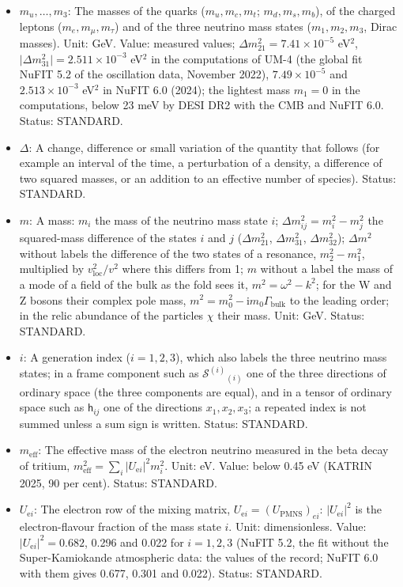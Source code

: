 \documentclass[
  10pt,
]{article}
\providecommand{\tightlist}{%
  \setlength{\itemsep}{0pt}\setlength{\parskip}{0pt}}
\begin{document}
\begin{itemize}
\tightlist
\item
  \(m_u, \dots, m_3\): The masses of the quarks (\(m_u, m_c, m_t\);
  \(m_d, m_s, m_b\)), of the charged leptons (\(m_e, m_\mu, m_\tau\))
  and of the three neutrino mass states (\(m_1, m_2, m_3\), Dirac
  masses). Unit: GeV. Value: measured values;
  \(\Delta m_{21}^2 = 7.41\times10^{-5}\) eV\(^2\),
  \(\lvert\Delta m_{31}^2\rvert = 2.511\times10^{-3}\) eV\(^2\) in the
  computations of UM-4 (the global fit NuFIT 5.2 of the oscillation
  data, November 2022), \(7.49\times10^{-5}\) and \(2.513\times10^{-3}\)
  eV\(^2\) in NuFIT 6.0 (2024); the lightest mass \(m_1 = 0\) in the
  computations, below 23 meV by DESI DR2 with the CMB and NuFIT 6.0.
  Status: STANDARD.
\item
  \(\Delta\): A change, difference or small variation of the quantity
  that follows (for example an interval of the time, a perturbation of a
  density, a difference of two squared masses, or an addition to an
  effective number of species). Status: STANDARD.
\item
  \(m\): A mass: \(m_i\) the mass of the neutrino mass state \(i\);
  \(\Delta m_{ij}^2 = m_i^2 - m_j^2\) the squared-mass difference of the
  states \(i\) and \(j\) (\(\Delta m_{21}^2\), \(\Delta m_{31}^2\),
  \(\Delta m_{32}^2\)); \(\Delta m^2\) without labels the difference of
  the two states of a resonance, \(m_2^2 - m_1^2\), multiplied by
  \(v_{\mathrm{loc}}^2/v^2\) where this differs from 1; \(m\) without a
  label the mass of a mode of a field of the bulk as the fold sees it,
  \(m^2 = \omega^2 - k^2\); for the W and Z bosons their complex pole
  mass, \(m^2 = m_0^2 - \mathrm{i}m_0\Gamma_{\mathrm{bulk}}\) to the
  leading order; in the relic abundance of the particles \(\chi\) their
  mass. Unit: GeV. Status: STANDARD.
\item
  \(i\): A generation index (\(i = 1, 2, 3\)), which also labels the
  three neutrino mass states; in a frame component such as
  \(\mathcal{S}^{(i)}{}_{(i)}\) one of the three directions of ordinary
  space (the three components are equal), and in a tensor of ordinary
  space such as \(\mathsf{h}_{ij}\) one of the directions
  \(x_1, x_2, x_3\); a repeated index is not summed unless a sum sign is
  written. Status: STANDARD.
\item
  \(m_{\mathrm{eff}}\): The effective mass of the electron neutrino
  measured in the beta decay of tritium,
  \(m_{\mathrm{eff}}^2 = \sum_i\lvert U_{\mathrm{e}i}\rvert^2m_i^2\).
  Unit: eV. Value: below 0.45 eV (KATRIN 2025, 90 per cent). Status:
  STANDARD.
\item
  \(U_{\mathrm{e}i}\): The electron row of the mixing matrix,
  \(U_{\mathrm{e}i} = (U_{\mathrm{PMNS}})_{ei}\):
  \(\lvert U_{\mathrm{e}i}\rvert^2\) is the electron-flavour fraction of
  the mass state \(i\). Unit: dimensionless. Value:
  \(\lvert U_{\mathrm{e}i}\rvert^2 = 0.682\), 0.296 and 0.022 for
  \(i = 1, 2, 3\) (NuFIT 5.2, the fit without the Super-Kamiokande
  atmospheric data: the values of the record; NuFIT 6.0 with them gives
  0.677, 0.301 and 0.022). Status: STANDARD.
\end{itemize}
\end{document}
